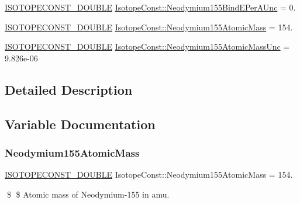 \begin{DoxyCompactItemize}
\mbox{\hyperlink{group___isotope_const-_macros_ga8f45a7272ce02c0b4c65c44636ed719a}{I\+S\+O\+T\+O\+P\+E\+C\+O\+N\+S\+T\+\_\+\+D\+O\+U\+B\+LE}} \mbox{\hyperlink{group___isotope_const-_neodymium-_nd155_ga14881130656f493553547f21db477f0a}{Isotope\+Const\+::\+Neodymium155\+Bind\+E\+Per\+A\+Unc}} = 0.
\item 
\mbox{\hyperlink{group___isotope_const-_macros_ga8f45a7272ce02c0b4c65c44636ed719a}{I\+S\+O\+T\+O\+P\+E\+C\+O\+N\+S\+T\+\_\+\+D\+O\+U\+B\+LE}} \mbox{\hyperlink{group___isotope_const-_neodymium-_nd155_ga588d0b6466419e472fdb5ddc3a05446e}{Isotope\+Const\+::\+Neodymium155\+Atomic\+Mass}} = 154.
\item 
\mbox{\hyperlink{group___isotope_const-_macros_ga8f45a7272ce02c0b4c65c44636ed719a}{I\+S\+O\+T\+O\+P\+E\+C\+O\+N\+S\+T\+\_\+\+D\+O\+U\+B\+LE}} \mbox{\hyperlink{group___isotope_const-_neodymium-_nd155_ga7275d93e46ac3bf993697d0c6b43c73e}{Isotope\+Const\+::\+Neodymium155\+Atomic\+Mass\+Unc}} = 9.\+826e-\/06
\end{DoxyCompactItemize}


\subsection{Detailed Description}


\subsection{Variable Documentation}
\mbox{\label{group___isotope_const-_neodymium-_nd155_ga588d0b6466419e472fdb5ddc3a05446e}} 
\subsubsection{\texorpdfstring{Neodymium155\+Atomic\+Mass}{Neodymium155AtomicMass}}
{\footnotesize\ttfamily \mbox{\hyperlink{group___isotope_const-_macros_ga8f45a7272ce02c0b4c65c44636ed719a}{I\+S\+O\+T\+O\+P\+E\+C\+O\+N\+S\+T\+\_\+\+D\+O\+U\+B\+LE}} Isotope\+Const\+::\+Neodymium155\+Atomic\+Mass = 154.}

\$ \$ Atomic mass of Neodymium-\/155 in amu. \mbox{\label{group___isotope_const-_neodymium-_nd155_ga7275d93e46ac3bf993697d0c6b43c73e}} 

